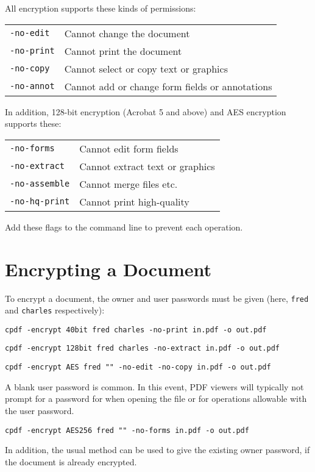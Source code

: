 \documentclass{book}
\begin{document}
   \vspace{2mm}
   \noindent All encryption supports these kinds of permissions:

   \vspace{2mm}
   \begin{tabular}{ll}
     \texttt{-no-edit} & Cannot change the document\\
     \texttt{-no-print} & Cannot print the document\\
     \texttt{-no-copy} & Cannot select or copy text or graphics\\
     \texttt{-no-annot} & Cannot add or change form fields or annotations\\
   \end{tabular}

   \vspace{2mm}
   \noindent In addition, 128-bit encryption (Acrobat 5 and above) and AES encryption supports these:

   \vspace{2mm}
   \begin{tabular}{ll}
     \texttt{-no-forms} & Cannot edit form fields\\
     \texttt{-no-extract} & Cannot extract text or graphics\\
     \texttt{-no-assemble} & Cannot merge files etc.\\
     \texttt{-no-hq-print} & Cannot print high-quality\\
   \end{tabular}

  \vspace{2mm}
  \noindent Add these flags to the command line to prevent each operation.

  \vspace{2mm}

  \section{Encrypting a Document}
  To encrypt a document, the owner and user passwords must be given (here, \texttt{fred} and \texttt{charles} respectively):
  \begin{framed}
    \small\verb!cpdf -encrypt 40bit fred charles -no-print in.pdf -o out.pdf!

    \vspace{1.5mm}
    \small\verb!cpdf -encrypt 128bit fred charles -no-extract in.pdf -o out.pdf!

    \vspace{1.5mm}
    \small\verb!cpdf -encrypt AES fred "" -no-edit -no-copy in.pdf -o out.pdf!
  \end{framed}
  \noindent A blank user password is
common. In this event, PDF viewers will typically not prompt for a
password for when opening the file or for operations allowable with the user password.
  \begin{framed}
    \vspace{1.5mm}
    \small\verb!cpdf -encrypt AES256 fred "" -no-forms in.pdf -o out.pdf!
  \end{framed}
\noindent In addition, the usual method can be used to give the existing owner
password, if the document is already encrypted. 
\end{document}
